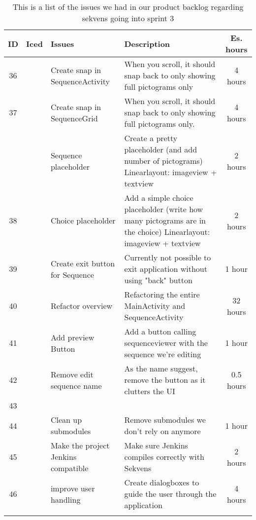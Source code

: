 \begin{longtable} { | c | c | p{5cm} | p{5cm} | c | } 
\hline
	ID 	&	Iced	&	Issues	&	Description		&	 Es. hours \\\hline
	36	& 	 	&	Create snap in SequenceActivity		& 	When you scroll, it should snap back to only showing full pictograms only	 & 4 hours \\\hline
	37	& 	 	&	Create snap in SequenceGrid		& 	When you scroll, it should snap back to only showing full pictograms only.	 & 4 hours \\\hline
		&		 &	Sequence placeholder 	 &		Create a pretty placeholder (and add number of pictograms) Linearlayout: imageview + textview			 &	2 hours\\\hline
	38	&		 &	Choice placeholder		 &		Add a simple choice placeholder (write how many pictograms are in the choice) Linearlayout: imageview + textview			 &	2 hours \\\hline
	39	&		& 	Create exit button for Sequence	 &		Currently not possible to exit application without using "back" button	 &	 1 hour		\\\hline
	40	&		 &	Refactor overview		 &		Refactoring the entire MainActivity and SequenceActivity	 &	32 hours \\\hline
	41	&		 &	Add preview Button		 &		Add a button calling sequenceviewer with the sequence we're editing		 & 1 hour	\\\hline
	42	&		 &	Remove edit sequence name	 &	As the name suggest, remove the button as it clutters the UI		 &	0.5 hours \\\hline
	43	&		 &			 &					 &	\\\hline
	44	&		 & 	Clean up submodules  &		Remove submodules we don't rely on anymore	 &	1 hour\\\hline
	45	&		 &	Make the project Jenkins compatible		 &		Make sure Jenkins compiles correctly with Sekvens			 &	2 hours \\\hline
	46	&		 &	improve user handling 		 &		Create dialogboxes to guide the user through the application		 &	4 hours \\\hline
\caption{This is a list of the issues we had in our product backlog regarding sekvens going into sprint 3}
\label{tab:spr3_prodblog}
\end{longtable}
